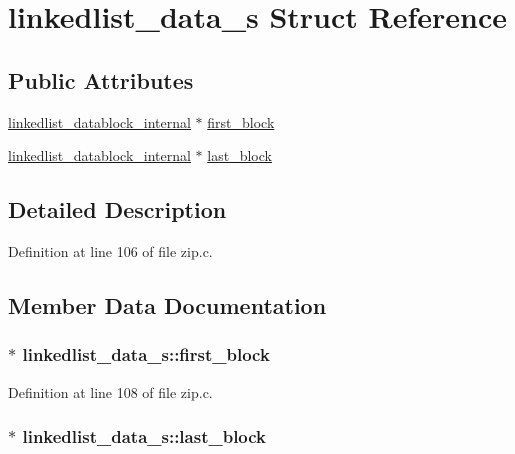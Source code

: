 \hypertarget{structlinkedlist__data__s}{\section{linkedlist\-\_\-data\-\_\-s Struct Reference}
\label{structlinkedlist__data__s}
}
\subsection*{Public Attributes}
\begin{DoxyCompactItemize}
\item 
\hyperlink{zip_8c_a0fbdcdae11bfc659d6df182b6d3407ba}{linkedlist\-\_\-datablock\-\_\-internal} $\ast$ \hyperlink{structlinkedlist__data__s_aa0a9c876ad4a05aa5969d8888fb57cdb}{first\-\_\-block}
\item 
\hyperlink{zip_8c_a0fbdcdae11bfc659d6df182b6d3407ba}{linkedlist\-\_\-datablock\-\_\-internal} $\ast$ \hyperlink{structlinkedlist__data__s_a26afdb5141483c909dafb8c5fd016bb8}{last\-\_\-block}
\end{DoxyCompactItemize}


\subsection{Detailed Description}


Definition at line 106 of file zip.\-c.



\subsection{Member Data Documentation}
\hypertarget{structlinkedlist__data__s_aa0a9c876ad4a05aa5969d8888fb57cdb}{
\subsubsection[{first\-\_\-block}]{$\ast$ linkedlist\-\_\-data\-\_\-s\-::first\-\_\-block}}\label{structlinkedlist__data__s_aa0a9c876ad4a05aa5969d8888fb57cdb}


Definition at line 108 of file zip.\-c.

\hypertarget{structlinkedlist__data__s_a26afdb5141483c909dafb8c5fd016bb8}{
\subsubsection[{last\-\_\-block}]{$\ast$ linkedlist\-\_\-data\-\_\-s\-::last\-\_\-block}}\label{structlinkedlist__data__s_a26afdb5141483c909dafb8c5fd016bb8}



